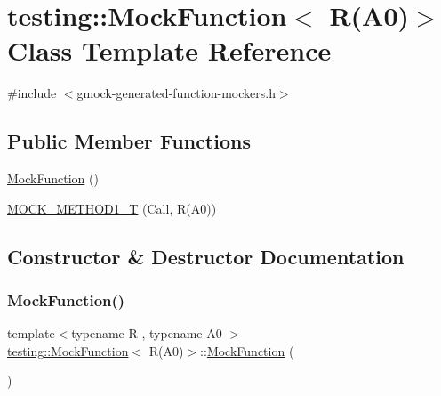 \hypertarget{classtesting_1_1_mock_function_3_01_r_07_a0_08_4}{}\section{testing\+:\+:Mock\+Function$<$ R(A0)$>$ Class Template Reference}
\label{classtesting_1_1_mock_function_3_01_r_07_a0_08_4}


{\ttfamily \#include $<$gmock-\/generated-\/function-\/mockers.\+h$>$}

\subsection*{Public Member Functions}
\begin{DoxyCompactItemize}
\item 
\hyperlink{classtesting_1_1_mock_function_3_01_r_07_a0_08_4_a716abd3e67561edb8e431ffa55c4835d}{Mock\+Function} ()
\item 
\hyperlink{classtesting_1_1_mock_function_3_01_r_07_a0_08_4_a6a22e7e14b53d2df30bef4404b41fade}{M\+O\+C\+K\+\_\+\+M\+E\+T\+H\+O\+D1\+\_\+T} (Call, R(A0))
\end{DoxyCompactItemize}


\subsection{Constructor \& Destructor Documentation}
\mbox{\label{classtesting_1_1_mock_function_3_01_r_07_a0_08_4_a716abd3e67561edb8e431ffa55c4835d}} 
\subsubsection{\texorpdfstring{Mock\+Function()}{MockFunction()}}
{\footnotesize\ttfamily template$<$typename R , typename A0 $>$ \\
\hyperlink{classtesting_1_1_mock_function}{testing\+::\+Mock\+Function}$<$ R(A0)$>$\+::\hyperlink{classtesting_1_1_mock_function}{Mock\+Function} (\begin{DoxyParamCaption}{ }\end{DoxyParamCaption})\hspace{0.3cm}{\ttfamily [inline]}}



